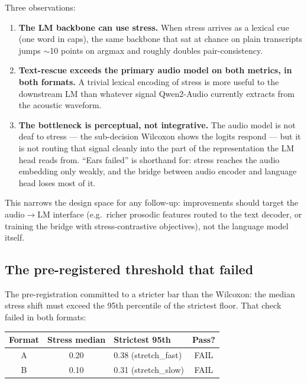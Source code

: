 \documentclass[11pt]{article}
\begin{document}
Three observations:

\begin{enumerate}
    \item \textbf{The LM backbone can use stress.} When stress
    arrives as a lexical cue (one word in caps), the same backbone
    that sat at chance on plain transcripts jumps $\sim$10 points
    on argmax and roughly doubles pair-consistency.
    \item \textbf{Text-rescue exceeds the primary audio model on
    both metrics, in both formats.} A trivial lexical encoding of
    stress is more useful to the downstream LM than whatever
    signal Qwen2-Audio currently extracts from the acoustic
    waveform.
    \item \textbf{The bottleneck is perceptual, not integrative.}
    The audio model is not deaf to stress --- the sub-decision
    Wilcoxon shows the logits respond --- but it is not routing
    that signal cleanly into the part of the representation the
    LM head reads from. ``Ears failed'' is shorthand for: stress
    reaches the audio embedding only weakly, and the bridge
    between audio encoder and language head loses most of it.
\end{enumerate}

This narrows the design space for any follow-up: improvements
should target the audio$\rightarrow$LM interface (e.g.\ richer
prosodic features routed to the text decoder, or training the
bridge with stress-contrastive objectives), not the language
model itself.

\subsection{The pre-registered threshold that failed}
\label{sec:prereg}

The pre-registration committed to a stricter bar than the
Wilcoxon: the median stress shift must exceed the 95th percentile
of the strictest floor. That check failed in both formats:

\begin{center}
\small
\begin{tabular}{c c l c}
\toprule
\textbf{Format} & \textbf{Stress median} & \textbf{Strictest 95th} & \textbf{Pass?} \\
\midrule
A & 0.20 & 0.38 (stretch\_fast) & FAIL \\
B & 0.10 & 0.31 (stretch\_slow) & FAIL \\
\bottomrule
\end{tabular}
\end{center}
\end{document}
